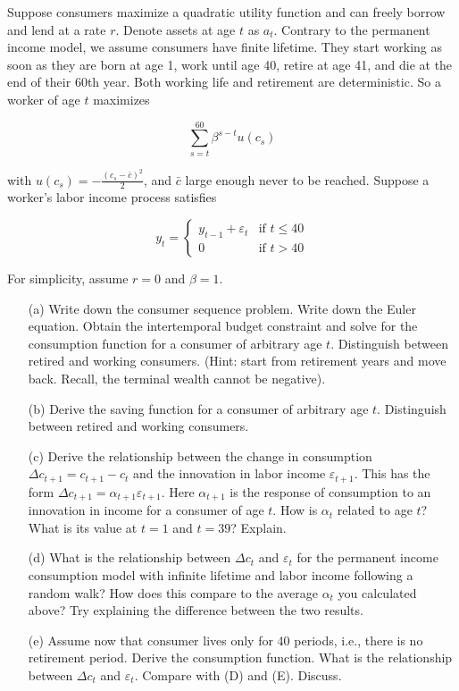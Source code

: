 \documentclass[10pt,a4paper]{article}
\begin{document}
Suppose consumers maximize a quadratic utility function and can freely borrow and lend at a rate $r$. Denote assets at age $t$ as $a_t$. Contrary to the permanent income model, we assume consumers have finite lifetime. They start working as soon as they are born at age 1, work until age 40, retire at age 41, and die at the end of their 60th year. Both working life and retirement are deterministic. So a worker of age $t$ maximizes

\[
\sum_{s=t}^{60} \beta^{s-t} u(c_s)
\]

with $u(c_s) = -\frac{(c_s - \bar{c})^2}{2}$, and $\bar{c}$ large enough never to be reached. Suppose a worker’s labor income process satisfies

\[
    y_t = \begin{cases} 
    y_{t-1} + \varepsilon_t & \text{if } t \leq 40 \\
    0 & \text{if } t > 40 
    \end{cases}
\]

For simplicity, assume $r = 0$ and $\beta = 1$.

\begin{enumerate}
    \item[(a)] Write down the consumer sequence problem. Write down the Euler equation. Obtain the intertemporal budget constraint and solve for the consumption function for a consumer of arbitrary age $t$. Distinguish between retired and working consumers. (Hint: start from retirement years and move back. Recall, the terminal wealth cannot be negative).
    \item[(b)] Derive the saving function for a consumer of arbitrary age $t$. Distinguish between retired and working consumers.
    \item[(c)] Derive the relationship between the change in consumption $\Delta c_{t+1} = c_{t+1} - c_t$ and the innovation in labor income $\varepsilon_{t+1}$. This has the form $\Delta c_{t+1} = \alpha_{t+1} \varepsilon_{t+1}$. Here $\alpha_{t+1}$ is the response of consumption to an innovation in income for a consumer of age $t$. How is $\alpha_t$ related to age $t$? What is its value at $t = 1$ and $t = 39$? Explain.
    \item[(d)] What is the relationship between $\Delta c_t$ and $\varepsilon_t$ for the permanent income consumption model with infinite lifetime and labor income following a random walk? How does this compare to the average $\alpha_t$ you calculated above? Try explaining the difference between the two results.
    \item[(e)] Assume now that consumer lives only for 40 periods, i.e., there is no retirement period. Derive the consumption function. What is the relationship between $\Delta c_t$ and $\varepsilon_t$. Compare with (D) and (E). Discuss.
\end{enumerate}
\end{document}
